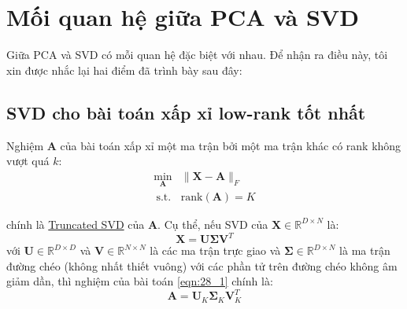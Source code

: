
 
 
 
 
\section{Mối quan hệ giữa PCA và SVD}
Giữa PCA và SVD có mỗi quan hệ đặc biệt với nhau. Để nhận ra điều này, tôi xin được nhắc lại hai điểm đã trình bày sau đây: 
 
 
\subsection{SVD cho bài toán xấp xỉ low-rank tốt nhất}
Nghiệm $\mathbf{A}$ của bài toán xấp xỉ một ma trận bởi một ma trận khác có rank không vượt quá $k$: 
\begin{equation} 
\label{eqn:28_1}
\begin{aligned} 
  \min_{\mathbf{A}} &\|\mathbf{X} - \mathbf{A}\|_F \\\ 
  \text{s.t.} & \text{rank}(\mathbf{A}) = K 
\end{aligned} 
\end{equation} 
 
chính là \href{http://machinelearningcoban.com/2017/06/07/svd/#-truncated-svd}{Truncated SVD} của $\mathbf{A}$. Cụ thể, nếu SVD của $\mathbf{X} \in\mathbb{R}^{D\times N}$ là: 
\begin{equation} 
  \mathbf{X} = \mathbf{U}\mathbf{\Sigma}\mathbf{V}^T 
\end{equation} 
với $\mathbf{U} \in \mathbb{R}^{D \times D}$ và $\mathbf{V}\in \mathbb{R}^{N\times N}$ là các ma trận trực giao và $\mathbf{\Sigma} \in \mathbb{R}^{D \times N}$ là ma trận đường chéo (không nhất thiết vuông) với các phần tử trên đường chéo không âm giảm dần, thì nghiệm của bài toán \eqref{eqn:28_1} chính là: 
\begin{equation} 
  \label{eqn:28_2}
  \mathbf{A} = \mathbf{U}_K \mathbf{\Sigma}_K \mathbf{V}_K^T
\end{equation} 
 
